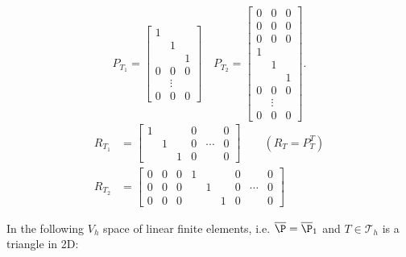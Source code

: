 \begin{example}
\label{thm:examplefiniteelemtents}
\[
P_{T_{1}}= \begin{bmatrix}
	1& & \\
	 &1& \\
	 & &1\\
	0&0&0\\
	 &\vdots& \\
	0&0&0
\end{bmatrix}
\quad
P_{T_{2}}= \begin{bmatrix}
	0&0&0\\
	0&0&0\\
	0&0&0\\
	1& & \\
	 &1& \\
	 & &1\\
	0&0&0\\
	 &\vdots& \\
	0&0&0
\end{bmatrix}
.\] 
\begin{align*}
	R_{T_1}&=\begin{bmatrix}
	1 & & & 0 &  & 0 \\
	 & 1 & &0 & \cdots & 0 \\
	 &&1 & 0 &  & 0
\end{bmatrix}
\qquad
(R_{T}=P_{T}^{T}) \\
		R_{T_2}&=\begin{bmatrix}
	0 &0 &0 &1 & & & 0 &  & 0 \\
	 0 &0 &0 && 1 & &0 & \cdots & 0 \\
	 0 &0 &0 &&&1 & 0 &  & 0
\end{bmatrix}
\end{align*}
\end{example}

In the following $V_{h}$ space of linear finite elements, i.e. $\overline{\P}= \overline{\P}_{1}$ and $T \in\mathcal{T}_{h}$ is a triangle in 2D:

